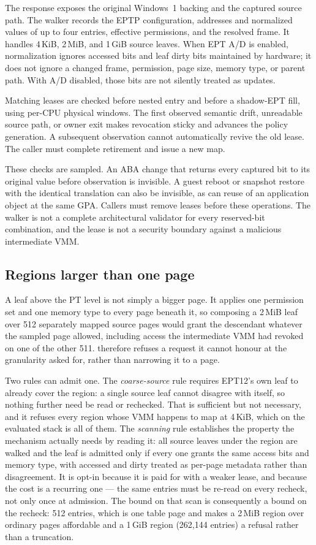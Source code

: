 The response exposes the original Windows~1 backing and the captured source
path. The walker records the EPTP configuration, addresses and normalized
values of up to four entries, effective permissions, and the resolved frame.
It handles 4\,KiB, 2\,MiB, and 1\,GiB source leaves. When EPT A/D is enabled,
normalization ignores accessed bits and leaf dirty bits maintained by hardware;
it does not ignore a changed frame, permission, page size, memory type, or parent
path. With A/D disabled, those bits are not silently treated as updates.

Matching leases are checked before nested entry and before a shadow-EPT fill,
using per-CPU physical windows. The first observed semantic drift, unreadable
source path, or owner exit makes revocation sticky and advances the policy
generation. A subsequent observation cannot automatically revive the old lease.
The caller must complete retirement and issue a new map.

These checks are sampled. An ABA change that returns every captured bit to its
original value before observation is invisible. A guest reboot or snapshot
restore with the identical translation can also be invisible, as can reuse of
an application object at the same GPA. Callers must remove leases before these
operations. The walker is not a complete architectural validator for every
reserved-bit combination, and the lease is not a security boundary against a
malicious intermediate VMM.

\subsection{Regions larger than one page}
\label{sec:region}
A leaf above the PT level is not simply a bigger page. It applies one permission
set and one memory type to every page beneath it, so composing a 2\,MiB leaf
over 512 separately mapped source pages would grant the descendant whatever the
sampled page allowed, including access the intermediate VMM had revoked on one
of the other 511. \ks{} therefore refuses a request it cannot honour at the
granularity asked for, rather than narrowing it to a page.

Two rules can admit one. The \emph{coarse-source} rule requires EPT12's own leaf
to already cover the region: a single source leaf cannot disagree with itself,
so nothing further need be read or rechecked. That is sufficient but not
necessary, and it refuses every region whose VMM happens to map at 4\,KiB,
which on the evaluated stack is all of them. The \emph{scanning} rule
establishes the property the mechanism actually needs by reading it: all source
leaves under the region are walked and the leaf is admitted only if every one
grants the same access bits and memory type, with accessed and dirty treated as
per-page metadata rather than disagreement. It is opt-in because it is paid for
with a weaker lease, and because the cost is a recurring one --- the same
entries must be re-read on every recheck, not only once at admission. The bound
on that scan is consequently a bound on the recheck: 512 entries, which is one
table page and makes a 2\,MiB region over ordinary pages affordable and a 1\,GiB
region (262,144 entries) a refusal rather than a truncation.


